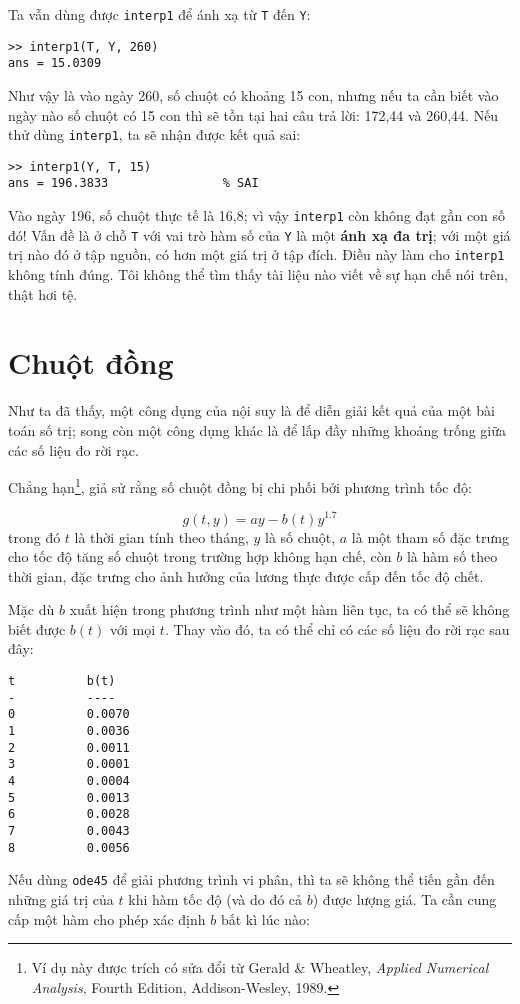 \documentclass[12pt]{book}
\begin{document}
Ta vẫn dùng được  {\tt interp1} để ánh xạ từ {\tt T} đến  {\tt Y}:

\begin{verbatim}
>> interp1(T, Y, 260)
ans = 15.0309
\end{verbatim}
%
Như vậy là vào ngày 260, số chuột có khoảng 15 con, nhưng nếu ta cần biết 
vào ngày nào số chuột có 15 con thì sẽ tồn tại hai câu trả lời: 172,44 và 
260,44.  Nếu thử dùng  {\tt interp1}, ta sẽ nhận được kết quả sai:

\begin{verbatim}
>> interp1(Y, T, 15)         
ans = 196.3833                % SAI 
\end{verbatim}
%
Vào ngày 196, số chuột thực tế là 16,8; vì vậy  {\tt interp1} còn không đạt 
gần con số đó! Vấn đề là ở chỗ {\tt T} với vai trò hàm số của {\tt Y} là một 
{\bf ánh xạ đa trị}; với một giá trị nào đó ở tập nguồn, có hơn một giá trị ở 
tập đích. Điều này làm cho {\tt interp1} không tính đúng. Tôi không thể tìm thấy 
tài liệu nào viết về sự hạn chế nói trên, thật hơi tệ.


\section{Chuột đồng}

Như ta đã thấy, một công dụng của nội suy là để diễn giải kết quả của một 
bài toán số trị; song còn một công dụng khác là để lấp đầy những khoảng 
trống giữa các số liệu đo rời rạc.

Chẳng hạn\footnote{Ví dụ này được trích có sửa đổi từ Gerald \& Wheatley,
{\em Applied Numerical Analysis}, Fourth Edition, Addison-Wesley,
1989.}, giả sử rằng số chuột đồng bị chi phối bởi phương trình tốc độ:

\[ g(t, y) = ay - b(t) y^{1.7} \]
%
trong đó  $t$ là thời gian tính theo tháng, $y$ là số chuột, $a$ là một tham số 
đặc trưng cho tốc độ tăng số chuột trong trường hợp không hạn chế, còn 
$b$ là hàm số theo thời gian, đặc trưng cho ảnh hưởng của lương thực 
được cấp đến tốc độ chết.

Mặc dù $b$ xuất hiện trong phương trình như một hàm liên tục, ta có thể sẽ 
không biết được $b(t)$ với mọi $t$.  Thay vào đó, ta có thể chỉ có các số liệu đo 
rời rạc sau đây:

\begin{verbatim}
t          b(t)
-          ----
0          0.0070
1          0.0036             
2          0.0011
3          0.0001
4          0.0004
5          0.0013
6          0.0028
7          0.0043
8          0.0056
\end{verbatim}
%
Nếu dùng {\tt ode45} để giải phương trình vi phân, thì ta sẽ không thể 
tiến gần đến những giá trị của $t$ khi hàm tốc độ (và do đó cả $b$) 
được lượng giá. Ta cần cung cấp một hàm cho phép xác định $b$ bất kì lúc nào:
\end{document}

